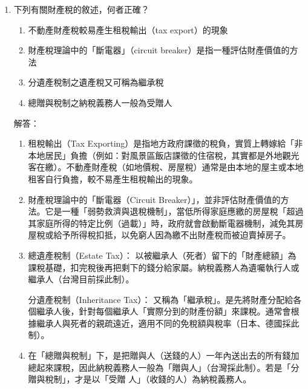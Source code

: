 \documentclass[12pt, a4paper]{article}
\begin{document}
\begin{enumerate}
    \item 下列有關財產稅的敘述，何者正確？
    \begin{enumerate}[label=\Alph*.]
        \item 不動產財產稅較易產生租稅輸出（tax export）的現象
        \item 財產稅理論中的「斷電器」（circuit breaker）是指一種評估財產價值的方法
        \item 分遺產稅制之遺產稅又可稱為繼承稅
        \item 總贈與稅制之納稅義務人一般為受贈人
    \end{enumerate}
    解答：
    \begin{enumerate}[label=\Alph*.]
        \item 租稅輸出（Tax Exporting）是指地方政府課徵的稅負，實質上轉嫁給「非本地居民」負擔（例如：對風景區飯店課徵的住宿稅，其實都是外地觀光客在繳）。不動產財產稅（如地價稅、房屋稅）通常是由本地的屋主或本地租客自行負擔，較不易產生租稅輸出的現象。
        \item 財產稅理論中的「斷電器（Circuit Breaker）」，並非評估財產價值的方法。它是一種「弱勢救濟與退稅機制」，當低所得家庭應繳的房屋稅「超過其家庭所得的特定比例（過載）」時，政府就會啟動斷電器機制，減免其房屋稅或給予所得稅扣抵，以免窮人因為繳不出財產稅而被迫賣掉房子。
        \item 總遺產稅制（Estate Tax）： 以被繼承人（死者）留下的「財產總額」為課稅基礎，扣完稅後再把剩下的錢分給家屬。納稅義務人為遺囑執行人或繼承人（台灣目前採此制）。

        分遺產稅制（Inheritance Tax）： 又稱為「繼承稅」。是先將財產分配給各個繼承人後，針對每個繼承人「實際分到的財產份額」來課稅。通常會根據繼承人與死者的親疏遠近，適用不同的免稅額與稅率（日本、德國採此制）。
        \item 在「總贈與稅制」下，是把贈與人（送錢的人）一年內送出去的所有錢加總起來課稅，因此納稅義務人一般為「贈與人」（台灣採此制）。若是「分贈與稅制」，才是以「受贈 人」（收錢的人）為納稅義務人。
    \end{enumerate}


\end{enumerate}
\end{document}
